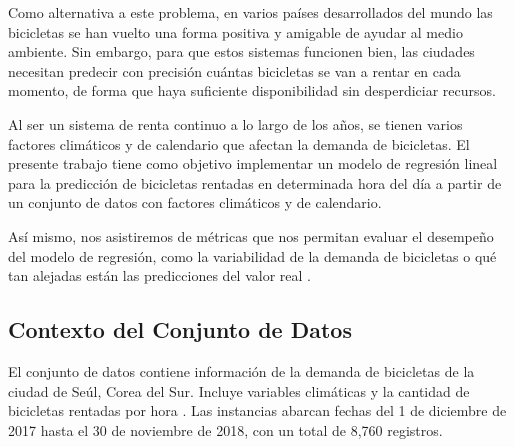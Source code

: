 \documentclass[10pt,journal,compsoc]{IEEEtran}
\begin{document}
Como alternativa a este problema, en varios países desarrollados del mundo las bicicletas se han vuelto una forma positiva y amigable de ayudar al medio ambiente. Sin embargo, para que estos sistemas funcionen bien, las ciudades necesitan predecir con precisión cuántas bicicletas se van a rentar en cada momento, de forma que haya suficiente disponibilidad sin desperdiciar recursos.

Al ser un sistema de renta continuo a lo largo de los años, se tienen varios factores climáticos y de calendario que afectan la demanda de bicicletas. El presente trabajo tiene como objetivo implementar un modelo de regresión lineal para la predicción de bicicletas rentadas en determinada hora del día a partir de un conjunto de datos con factores climáticos y de calendario.

Así mismo, nos asistiremos de métricas que nos permitan evaluar el desempeño del modelo de regresión, como la variabilidad de la demanda de bicicletas o qué tan alejadas están las predicciones del valor real \cite{metrics}.

\subsection{Contexto del Conjunto de Datos}
El conjunto de datos contiene información de la demanda de bicicletas de la ciudad de Seúl, Corea del Sur. Incluye variables climáticas y la cantidad de bicicletas rentadas por hora \cite{dataset}. Las instancias abarcan fechas del 1 de diciembre de 2017 hasta el 30 de noviembre de 2018, con un total de 8,760 registros. 

\end{document}
